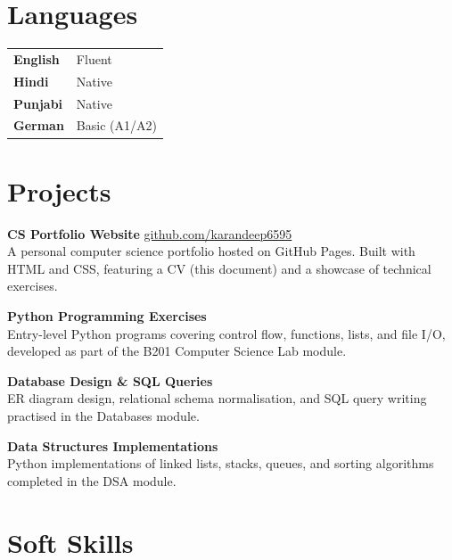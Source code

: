 \documentclass[a4paper,10pt]{article}
\begin{document}
\section{Languages}

\begin{tabular}{@{}p{3.5cm} p{11cm}}
  \textbf{English}  & Fluent \\
  \textbf{Hindi}    & Native \\
  \textbf{Punjabi}  & Native \\
  \textbf{German}   & Basic (A1/A2) \\
\end{tabular}

\section{Projects}

\textbf{CS Portfolio Website} \hfill \href{https://github.com/karandeep6595}{github.com/karandeep6595}\\
A personal computer science portfolio hosted on GitHub Pages. Built with HTML and CSS,
featuring a CV (this document) and a showcase of technical exercises.

\vspace{6pt}
\textbf{Python Programming Exercises}\\
Entry-level Python programs covering control flow, functions, lists, and file I/O,
developed as part of the B201 Computer Science Lab module.

\vspace{6pt}
\textbf{Database Design \& SQL Queries}\\
ER diagram design, relational schema normalisation, and SQL query writing
practised in the Databases module.

\vspace{6pt}
\textbf{Data Structures Implementations}\\
Python implementations of linked lists, stacks, queues, and sorting algorithms
completed in the DSA module.

\section{Soft Skills}
\end{document}
